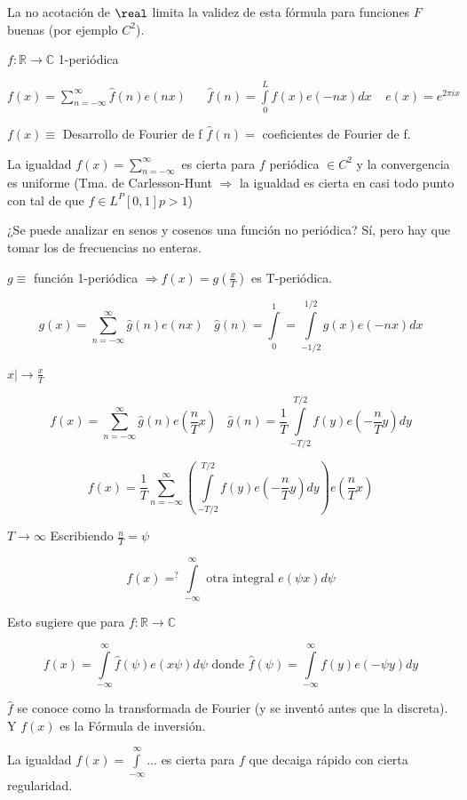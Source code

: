 \obs La no acotación de $\real$ limita la validez de esta fórmula para funciones $F$  buenas (por ejemplo $C^2$).






$ f: \mathbb{R} \rightarrow \mathbb{C} $ 1-periódica

$f(x) = \sum\limits_{n=-\infty}^{\infty} \hat{f}(n) e(nx) \;\;\;\;\;\; \hat{f}(n) = \int\limits_{0}^{L} f(x) e (-nx) dx \;\;\;\; e(x) = e^{2 \pi i x}$

$f(x) \equiv $ Desarrollo de Fourier de f \;\;\;\; $\hat{f}(n) =$ coeficientes de Fourier de f.

La igualdad $f(x) = \sum^{\infty}_{n=-\infty}$ es cierta para $f$ periódica $\in C^{2}$ y la convergencia es uniforme (Tma. de Carlesson-Hunt $\Rightarrow$ la igualdad es cierta en casi todo punto con tal de que $f \in L^{P} [0,1] p > 1$)

¿Se puede analizar en senos y cosenos una función no periódica? Sí, pero hay que tomar los de frecuencias no enteras.

$g \equiv $ función 1-periódica $ \Rightarrow f(x) = g(\frac{x}{T})$ es T-periódica.

$$ g(x) = \sum^{\infty}_{n=-\infty} \hat{g}(n) e(nx) \;\;\; \hat{g}(n) = \int\limits^{1}_{0} = \int\limits^{1/2}_{-1/2} g(x) e(-nx) dx $$

$x |\rightarrow \frac{x}{T} $

$$f(x) = \sum_{n = -\infty}^{\infty} \hat{g}(n) e(\frac{n}{T}x) \;\;\; \hat{g}(n) = \frac{1}{T} \int\limits^{T/2}_{-T/2} f(y) e(-\frac{n}{T}y) dy$$

$$f(x) = \frac{1}{T} \sum_{n = -\infty}^{\infty} \left(  \int\limits^{T/2}_{-T/2} f(y) e(-\frac{n}{T}y) dy \right) e (\frac{n}{T}x)$$

$T \rightarrow \infty$ Escribiendo $\frac{n}{T} = \psi$

$$ f(x) =^{?} \int\limits^{\infty}_{-\infty} \text{ otra integral } e(\psi x) d\psi $$

Esto sugiere que para $f: \mathbb{R} \rightarrow \mathbb{C}$

$$f(x) = \int\limits^{\infty}_{-\infty} \hat{f}(\psi) e (x \psi) d \psi \text{ donde } \hat{f}(\psi) = \int\limits^{\infty}_{-\infty} f(y) e(-\psi y)dy$$

$\hat{f}$ se conoce como la transformada de Fourier (y se inventó antes que la discreta). Y $f(x)$ es la Fórmula de inversión.

La igualdad $f(x) = \int\limits^{\infty}_{-\infty} $... es cierta para $f$ que decaiga rápido con cierta regularidad.

